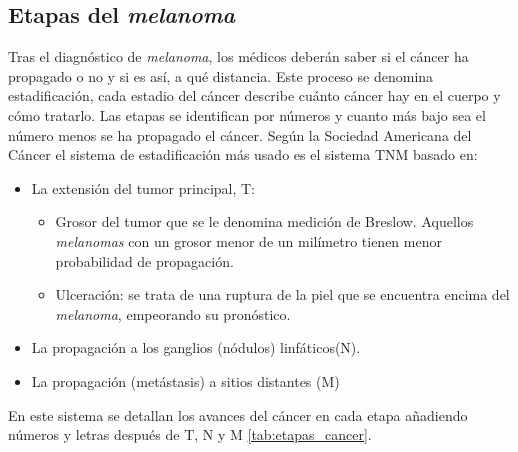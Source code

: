 \subsection{Etapas del \textit{melanoma}}
Tras el diagnóstico de \textit{melanoma}, los médicos deberán saber si el cáncer ha propagado o no y si es así, a qué  distancia. Este proceso se denomina estadificación, cada estadio del cáncer describe cuánto cáncer hay en el cuerpo y cómo tratarlo. Las etapas se identifican por números y cuanto más bajo sea el número menos se ha propagado el cáncer.
Según la Sociedad Americana del Cáncer \cite{EtapasCancerPiel} el sistema de estadificación más usado es el sistema TNM basado en:
\begin{itemize}
    \item La  extensión del tumor principal, T:
    \begin{itemize}
        \item Grosor del tumor que se le denomina medición de Breslow. Aquellos \textit{melanomas} con un grosor menor de un milímetro tienen menor probabilidad de propagación.
        \item Ulceración: se trata de una ruptura de la piel que se encuentra encima del \textit{melanoma}, empeorando su pronóstico.
    \end{itemize}
    \item La propagación a los ganglios (nódulos) linfáticos(N).
    \item La propagación (metástasis) a sitios distantes (M)
\end{itemize}
En este sistema se detallan los avances del cáncer en cada etapa añadiendo números y letras después de T, N y M \ref{tab:etapas_cancer}.


